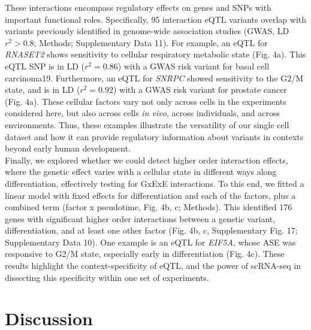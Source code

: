 These interactions encompass regulatory effects on genes and SNPs with important functional roles. Specifically, 95 interaction eQTL variants overlap with variants previously identified in genome-wide association studies (GWAS, LD $r^2>0.8$; Methods; Supplementary Data 11). 
For example, an eQTL for \textit{RNASET2} shows sensitivity to cellular respiratory metabolic state (Fig. 4a). 
This eQTL SNP is in LD ($r^2=0.86$) with a GWAS risk variant for basal cell carcinoma19. Furthermore, an eQTL for \textit{SNRPC} showed sensitivity to the G2/M state, and is in LD ($r^2=0.92$) with a GWAS risk variant for prostate cancer (Fig. 4a). 
These cellular factors vary not only across cells in the experiments considered here, but also across cells \textit{in vivo}, across individuals, and across environments. 
Thus, these examples illustrate the versatility of our single cell dataset and how it can provide regulatory information about variants in contexts beyond early human development.\\

Finally, we explored whether we could detect higher order interaction effects, where the genetic effect varies with a cellular state in different ways along differentiation, effectively testing for GxExE interactions. 
To this end, we fitted a linear model with fixed effects for differentiation and each of the factors, plus a combined term (factor x pseudotime, Fig. 4b, c; Methods). 
This identified 176 genes with significant higher order interactions between a genetic variant, differentiation, and at least one other factor (Fig. 4b, c, Supplementary Fig. 17; Supplementary Data 10). 
One example is an eQTL for \textit{EIF5A}, whose ASE was responsive to G2/M state, especially early in differentiation (Fig. 4c). 
These results highlight the context-specificity of eQTL, and the power of scRNA-seq in dissecting this specificity within one set of experiments.

\section{Discussion}